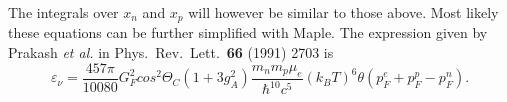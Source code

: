 The integrals over $x_n$ and $x_p$ will however be similar to those above.
Most likely these equations can be further simplified with Maple.
The expression given by Prakash {\em et al.} in Phys.\ Rev.\ Lett.\ {\bf 66}
(1991) 2703 is
\begin{equation}
      \varepsilon_{\nu}=\frac{457\pi}{10080}G_F^2cos^2\Theta_C(1+3g_A^2)
      \frac{m_nm_p\mu_e}{\hbar^{10}c^5}(k_BT)^6\theta(p_F^e+p_F^p-p_F^n).
\end{equation}




